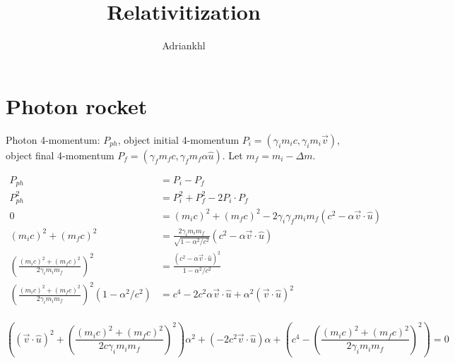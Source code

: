 \documentclass[12pt, letterpaper]{article}
\title{Relativitization}
\author{Adriankhl}
\begin{document}
\begin{titlepage}
\maketitle
\end{titlepage}

\section{Photon rocket}

Photon 4-momentum: $P_{ph}$, object initial 4-momentum $P_i = (\gamma_i m_i c, \gamma_i m_i \overrightarrow{v}) $,
object final 4-momentum $P_f = (\gamma_f m_f c, \gamma_f m_f \alpha \hat{u})$. Let $m_f = m_i - \Delta m$.

\begin{align*}
  P_{ph} &= P_i - P_f \\
  P_{ph}^2 &= P_i^2 + P_f^2 - 2 P_i \cdot P_f \\
  0 &= (m_i c)^2 + (m_f c)^2 - 2 \gamma_i \gamma_f m_i m_f ( c^2 - \alpha \overrightarrow{v} \cdot \hat{u}) \\
  (m_i c)^2 + (m_f c)^2 &= \frac{2 \gamma_i m_i m_f}{\sqrt{1 - \alpha^2 / c^2}} ( c^2 - \alpha \overrightarrow{v} \cdot \hat{u}) \\
  \left(\frac{(m_i c)^2 + (m_f c)^2}{2 \gamma_i m_i m_f}\right)^2 &= \frac{(c^2 - \alpha \overrightarrow{v} \cdot \hat{u})^2}{1 - \alpha^2 / c^2} \\
  \left(\frac{(m_i c)^2 + (m_f c)^2}{2 \gamma_i m_i m_f}\right)^2 (1 - \alpha^2 / c^2) &= c^4 - 2 c^2 \alpha \overrightarrow{v} \cdot \hat{u} + \alpha^2 (\overrightarrow{v} \cdot \hat{u})^2 \\
\end{align*}

\begin{equation*}
  ((\overrightarrow{v} \cdot \hat{u})^2 + \left(\frac{(m_i c)^2 + (m_f c)^2}{2 c \gamma_i m_i m_f}\right)^2) \alpha ^2 + (- 2 c^2 \overrightarrow{v} \cdot \hat{u}) \alpha + \left(c^4 - \left(\frac{(m_i c)^2 + (m_f c)^2}{2 \gamma_i m_i m_f}\right)^2 \right) = 0
\end{equation*}
\end{document}
